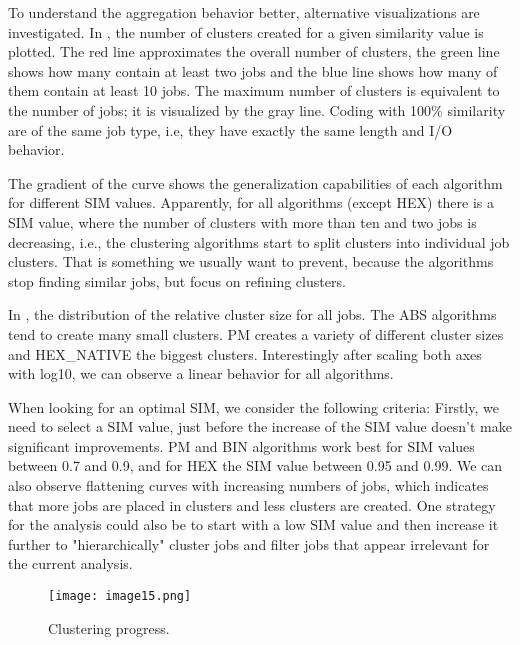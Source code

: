 \documentclass{jhps}
\begin{document}
\medskip

To understand the aggregation behavior better, alternative visualizations are investigated.
In , the number of clusters created for a given similarity value is plotted.
The red line approximates the overall number of clusters, the green line shows how many contain at least two jobs and the blue line shows how many of them contain at least 10 jobs.
The maximum number of clusters is equivalent to the number of jobs; it is visualized by the gray line.
Coding with 100$\%$  similarity are of the same job type, i.e, they have exactly the same length and I/O behavior.

The gradient of the curve shows the generalization capabilities of each algorithm for different SIM values.
Apparently, for all algorithms (except HEX) there is a SIM value, where the number of clusters with more than ten and two jobs is decreasing, i.e., the clustering algorithms start to split clusters into individual job clusters.
That is something we usually want to prevent, because the algorithms stop finding similar jobs, but focus on refining clusters.

\smallskip

In , the distribution of the relative cluster size for all jobs.
The ABS algorithms tend to create many small clusters.
PM creates a variety of different cluster sizes and HEX\_NATIVE the biggest clusters.
Interestingly after scaling both axes with log10, we can observe a linear behavior for all algorithms.

When looking for an optimal SIM, we consider the following criteria:
Firstly, we need to select a SIM value, just before the increase of the SIM value doesn't make significant improvements.
PM and BIN algorithms work best for SIM values between 0.7 and 0.9, and for HEX the SIM value between 0.95 and 0.99.
We can also observe flattening curves with increasing numbers of jobs, which indicates that more jobs are placed in clusters and less clusters are created.
One strategy for the analysis could also be to start with a low SIM value and then increase it further to "hierarchically" cluster jobs and filter jobs that appear irrelevant for the current analysis.

\begin{figure}
  \centering
   \texttt{[image: image15.png]}
   \caption{Clustering progress.}
   \label{fig:clustering_progress}
\end{figure}
\end{document}
